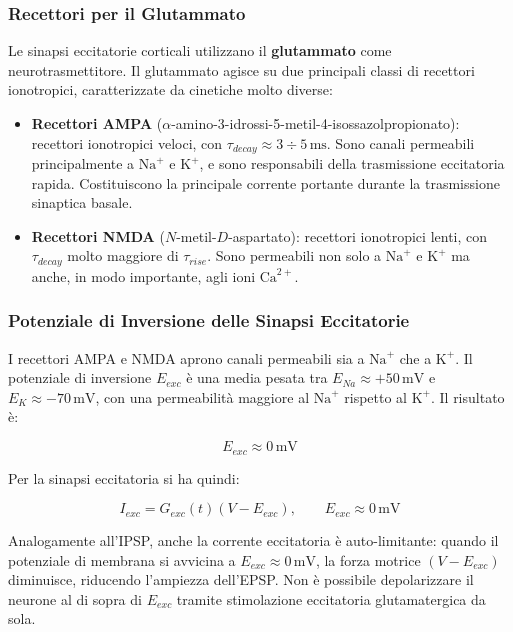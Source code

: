 \subsubsection{Recettori per il Glutammato}

Le sinapsi eccitatorie corticali utilizzano il \textbf{glutammato} come neurotrasmettitore. Il glutammato agisce su due principali classi di recettori ionotropici, caratterizzate da cinetiche molto diverse:

\begin{itemize}
    \item \textbf{Recettori AMPA} ($\alpha$-amino-3-idrossi-5-metil-4-isossazolpropionato): recettori ionotropici veloci, con $\tau_{decay} \approx 3 \div 5 \, \text{ms}$. Sono canali permeabili principalmente a $\text{Na}^+$ e $\text{K}^+$, e sono responsabili della trasmissione eccitatoria rapida. Costituiscono la principale corrente portante durante la trasmissione sinaptica basale.
    \item \textbf{Recettori NMDA} ($N$-metil-$D$-aspartato): recettori ionotropici lenti, con $\tau_{decay}$ molto maggiore di $\tau_{rise}$. Sono permeabili non solo a $\text{Na}^+$ e $\text{K}^+$ ma anche, in modo importante, agli ioni $\text{Ca}^{2+}$.
\end{itemize}

\subsubsection{Potenziale di Inversione delle Sinapsi Eccitatorie}

I recettori AMPA e NMDA aprono canali permeabili sia a $\text{Na}^+$ che a $\text{K}^+$. Il potenziale di inversione $E_{exc}$ è una media pesata tra $E_{Na} \approx +50 \, \text{mV}$ e $E_K \approx -70 \, \text{mV}$, con una permeabilità maggiore al $\text{Na}^+$ rispetto al $\text{K}^+$. Il risultato è:

\begin{equation}
E_{exc} \approx 0 \, \text{mV}
\end{equation}

Per la sinapsi eccitatoria si ha quindi:

\begin{equation}
I_{exc} = G_{exc}(t)(V - E_{exc}), \qquad E_{exc} \approx 0 \, \text{mV}
\end{equation}

Analogamente all'IPSP, anche la corrente eccitatoria è auto-limitante: quando il potenziale di membrana si avvicina a $E_{exc} \approx 0 \, \text{mV}$, la forza motrice $(V - E_{exc})$ diminuisce, riducendo l'ampiezza dell'EPSP. Non è possibile depolarizzare il neurone al di sopra di $E_{exc}$ tramite stimolazione eccitatoria glutamatergica da sola.



